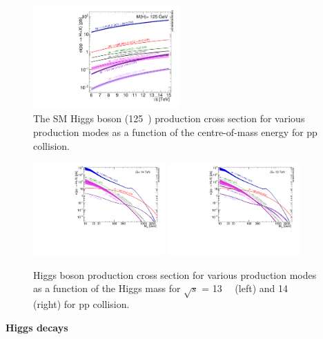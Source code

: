 \begin{figure}[!htb]
  \centering
  \includegraphics[width=0.5\textwidth]{figures/Theory/Plot_Escan_H125_new_sqrt.pdf}
    \caption{The SM Higgs boson (125~\gev) production cross section for various production modes as a function of the centre-of-mass energy for pp collision.}
  \label{fig:higgs_productions_xs}
\end{figure}
\begin{figure}[!htb]
  \centering
  \includegraphics[width=0.45\textwidth]{figures/Theory/plotAll_14tev_BSM_sqrt.pdf}
  \includegraphics[width=0.45\textwidth]{figures/Theory/plotAll_13tev_BSM_sqrt.pdf}
  \caption{Higgs boson production cross section for various production modes as a function of the Higgs mass for $\sqrt{s}$ = 13~\tev~ (left) and 14~\tev~ (right) for pp collision.}
  \label{fig:higgs_productions_xs2}
\end{figure}

\textbf{Higgs decays}

